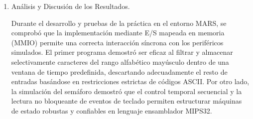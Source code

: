 \documentclass[12pt,a4paper]{article}
\begin{document}
\begin{enumerate}[label=\arabic*.]
\begin{enumerate}[label=\alph*)]
        \item ¿Qué debe hacer el software si el programa finaliza antes de que ocurra la interrupción de reloj?
        
        \vspace{0.3cm}
        \noindent
        El software debe cancelar, desarmar o reiniciar el temporizador programado (limpiando los registros de control del timer) para evitar que se genere una interrupción innecesaria o falsa cuando ya no hay un proceso activo al cual atender.
    \end{enumerate}

    \item Análisis y Discusión de los Resultados.

    \vspace{0.3cm}
    \noindent
    Durante el desarrollo y pruebas de la práctica en el entorno MARS, se comprobó que la implementación mediante E/S mapeada en memoria (MMIO) permite una correcta interacción síncrona con los periféricos simulados. El primer programa demostró ser eficaz al filtrar y almacenar selectivamente caracteres del rango alfabético mayúsculo dentro de una ventana de tiempo predefinida, descartando adecuadamente el resto de entradas basándose en restricciones estrictas de códigos ASCII. Por otro lado, la simulación del semáforo demostró que el control temporal secuencial y la lectura no bloqueante de eventos de teclado permiten estructurar máquinas de estado robustas y confiables en lenguaje ensamblador MIPS32.

\end{enumerate}
\end{document}
